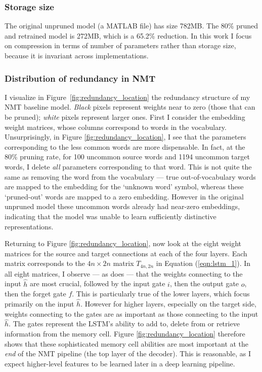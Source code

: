 \subsubsection{Storage size}
The original unpruned model (a MATLAB file) has size 782MB.
The 80\% pruned and retrained model is 272MB, which is a 65.2\% reduction.
In this work I focus on compression in terms of number of parameters rather than storage size, because it is invariant across implementations.

\subsubsection{Distribution of redundancy in NMT}
\label{subsubsec:redundancy}

I visualize in Figure~\ref{fig:redundancy_location} the redundancy structure of
my NMT baseline model.
{\it Black} pixels represent weights near to zero (those that can be pruned); {\it white} pixels represent larger ones.
First I consider the embedding weight matrices, whose columns correspond to words in the vocabulary.
Unsurprisingly, in Figure \ref{fig:redundancy_location}, I see that the parameters corresponding to the less common words are more dispensable.
In fact, at the 80\% pruning rate, for 100 uncommon source words and 1194
uncommon target words, I delete \emph{all} parameters corresponding to that word.
This is not quite the same as removing the word from the vocabulary --- true out-of-vocabulary words are mapped to the embedding for the `unknown word' symbol, whereas these `pruned-out' words are mapped to a zero embedding.
However in the original unpruned model these uncommon words already had near-zero embeddings, indicating that the model was unable to learn sufficiently distinctive representations.

Returning to Figure \ref{fig:redundancy_location}, now look at the eight weight matrices for the source and target connections at each of the four layers.
Each matrix corresponds to the $4n \times 2n$ matrix $T_{4n,2n}$ in Equation (\ref{eqn:lstm_1}).
In all eight matrices, I observe --- as does \cite{lu2016learning} --- that the weights connecting to the input $\hat{h}$ are most crucial, followed by the input gate $i$, then the output gate $o$, then the forget gate $f$. 
This is particularly true of the lower layers, which focus primarily on the input $\hat{h}$. 
However for higher layers, especially on the target side, weights connecting to the gates are as important as those connecting to the input $\hat{h}$.
The gates represent the LSTM's ability to add to, delete from or retrieve information from the memory cell.
Figure \ref{fig:redundancy_location} therefore shows that these sophisticated memory cell abilities are most important at the \emph{end} of the NMT pipeline (the top layer of the decoder).
This is reasonable, as I expect higher-level features to be learned later in a deep learning pipeline.

